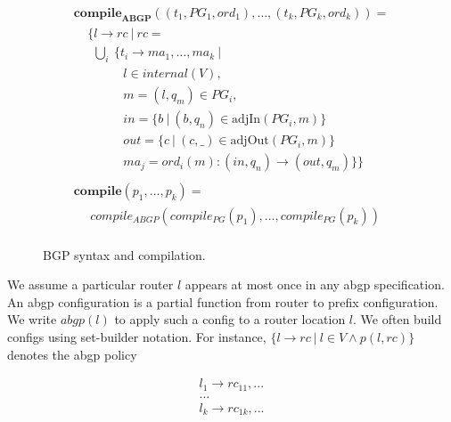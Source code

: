 \documentclass[twocolumn]{sig-alternate-10pt}
\begin{document}
\begin{figure}[h!]
\begin{minipage}[t]{.5\linewidth}
  \end{minipage}
  ~~
  \vrule
  ~~
  \begin{minipage}[t]{.5\linewidth}
  \vspace*{-1\baselineskip}
  \[ \begin{array}{l}
     \textbf{compile}_\textbf{ABGP}( (t_1,PG_1,ord_1), \dots, (t_k,PG_k,ord_k) ) = \\
     ~~~~~ \{ l \rightarrow rc ~\vert~ rc = \\
     ~~~~~~~ \bigcup_i~ \{ t_i \rightarrow ma_1, \dots, ma_k ~\vert~ \\
     ~~~~~~~~~~~~~~~~~~ l \in internal(V), \\
     ~~~~~~~~~~~~~~~~~~ m = (l,q_m) \in PG_i, \\
     ~~~~~~~~~~~~~~~~~~ in = \{ b ~\vert~ (b,q_n) \in \text{adjIn}(PG_i,m) \} \\
     ~~~~~~~~~~~~~~~~~~ out = \{ c ~\vert~ (c,\_) \in \text{adjOut}(PG_i,m) \} \\
     ~~~~~~~~~~~~~~~~~~ ma_j = ord_i(m) : (in,q_n) \rightarrow (out,q_m) \} \} \\
     \\
     \textbf{compile}( p_1, \dots, p_k ) = \\
     ~~~~~~ compile_{ABGP}(compile_{PG}(p_1), \dots, compile_{PG}(p_k)) \\

  \end{array} \]%

  \end{minipage}

  \vspace{1em}
  \hrulefill%
  \vspace{1em}

  \caption{BGP syntax and compilation.}
  \label{fig:abgp-syntax}
\end{figure}%

We assume a particular router $l$ appears at most once in any abgp specification.
An abgp configuration is a partial function from router to prefix configuration.
We write $abgp(l)$ to apply such a config to a router location $l$.
%
We often build configs using set-builder notation.  For instance,
$\{l \rightarrow rc ~\vert~ l \in V \wedge p(l,rc)\}$ denotes the abgp policy

\[ \begin{array}{c}
  l_1 \rightarrow rc_{11},... \\
  ...           \\
  l_k \rightarrow rc_{1k},... \\
\end{array} \]
\end{document}
